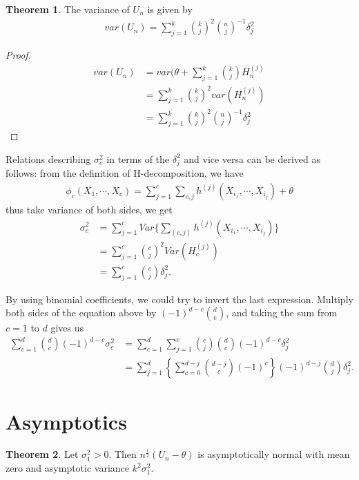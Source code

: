 \documentclass{article}
\theoremstyle{definition}
\newtheorem{theorem}{Theorem}
\numberwithin{Def}{section}
\begin{document}
\begin{itemize}
    
    \begin{theorem}
    The variance of $U_n$ is given by 
    \begin{align}
        var(U_n) = \sum_{j=1}^k {k \choose j}^2 {n \choose j}^{-1}\delta_j^2
    \end{align}
    \end{theorem}
    \begin{proof}
    \begin{align*}
        var(U_n) &= var(\theta + \sum_{j=1}^k {k \choose j}H_n^{(j)} \\
        &= \sum_{j=1}^k {k \choose j}^2var(H_n^{(j)})\\
        &= \sum_{j=1}^k {k \choose j}^2 {n \choose j}^{-1}\delta_j^2
    \end{align*}
    \end{proof}
    \end{itemize}
    Relations describing $\sigma_{c}^2$ in terms of the $\delta_j^2 $ and vice versa can be derived as follows: from the definition of H-decomposition, we have 
    \begin{align*}
        \phi_c (X_1, \cdots, X_c) = \sum_{j = 1}^c \sum_{c,j} h^{(j)} (X_{i_{1}}, \cdots , X_{i_j}) + \theta
    \end{align*}
    thus take variance of both sides, we get 
    \begin{align*}
        \sigma_{c}^2 &= \sum_{j = 1}^c Var\{ \sum_{(c, j)} h^{(j)} (X_{i_{1}}, \cdots , X_{i_j})\} \\
        &= \sum_{j = 1}^c {c \choose j}^2 Var( H_c^{(j)}) \\ 
        &= \sum_{j = 1}^c {c \choose j} \delta_j^2.
    \end{align*}
    
    By using binomial coefficients, we could try to invert the last expression. Multiply both sides of the equation above by  $(-1)^{d-c} {d \choose c}$, and taking the sum from $c = 1$ to $d$ gives us
    \begin{align*}
        \sum_{c=1}^d {d \choose c} (-1)^{d-c} \sigma_{c}^2 &= \sum_{c=1}^d  
       \sum_{j = 1}^c {c \choose j}  {d \choose c} (-1)^{d-c} \delta_j^2 \\
       &= \sum_{j=1}^d \left\{ \sum_{c = 0}^{d - j} {d - j \choose c} (-1)^c \right\} (-1)^{d -j} {d \choose j} \delta_j^2.
    \end{align*}
    
    \section{Asymptotics} 
    \begin{theorem}
    Let $\sigma_1^{2} > 0$. Then $n^{\frac{1}{2}}(U_n - \theta)$ is asymptotically normal with mean zero and asymptotic variance $k^2 \sigma_1^2$.
    \end{theorem}
    
\end{document}
